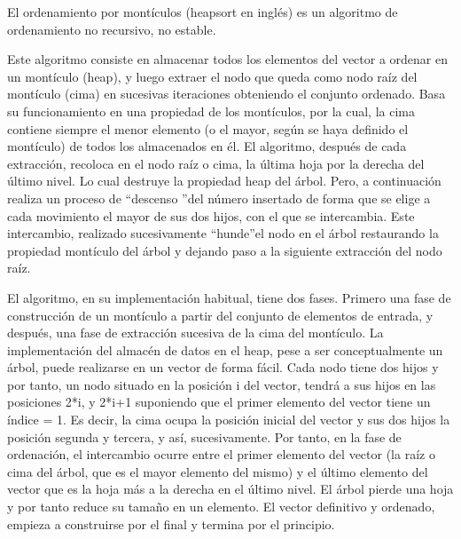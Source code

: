 El ordenamiento por montículos (heapsort en inglés) es un algoritmo de ordenamiento no recursivo, no estable.

Este algoritmo consiste en almacenar todos los elementos del vector a ordenar en un montículo (heap), y luego extraer el nodo que queda como nodo raíz del montículo (cima) en sucesivas iteraciones obteniendo el conjunto ordenado. Basa su funcionamiento en una propiedad de los montículos, por la cual, la cima contiene siempre el menor elemento (o el mayor, según se haya definido el montículo) de todos los almacenados en él. El algoritmo, después de cada extracción, recoloca en el nodo raíz o cima, la última hoja por la derecha del último nivel. Lo cual destruye la propiedad heap del árbol. Pero, a continuación realiza un proceso de \textquotedblleft descenso \textquotedblright del número insertado de forma que se elige a cada movimiento el mayor de sus dos hijos, con el que se intercambia. Este intercambio, realizado sucesivamente \textquotedblleft hunde\textquotedblright el nodo en el árbol restaurando la propiedad montículo del árbol y dejando paso a la siguiente extracción del nodo raíz.

El algoritmo, en su implementación habitual, tiene dos fases. Primero una fase de construcción de un montículo a partir del conjunto de elementos de entrada, y después, una fase de extracción sucesiva de la cima del montículo. La implementación del almacén de datos en el heap, pese a ser conceptualmente un árbol, puede realizarse en un vector de forma fácil. Cada nodo tiene dos hijos y por tanto, un nodo situado en la posición i del vector, tendrá a sus hijos en las posiciones 2*i, y 2*i+1 suponiendo que el primer elemento del vector tiene un índice = 1. Es decir, la cima ocupa la posición inicial del vector y sus dos hijos la posición segunda y tercera, y así, sucesivamente. Por tanto, en la fase de ordenación, el intercambio ocurre entre el primer elemento del vector (la raíz o cima del árbol, que es el mayor elemento del mismo) y el último elemento del vector que es la hoja más a la derecha en el último nivel. El árbol pierde una hoja y por tanto reduce su tamaño en un elemento. El vector definitivo y ordenado, empieza a construirse por el final y termina por el principio.
